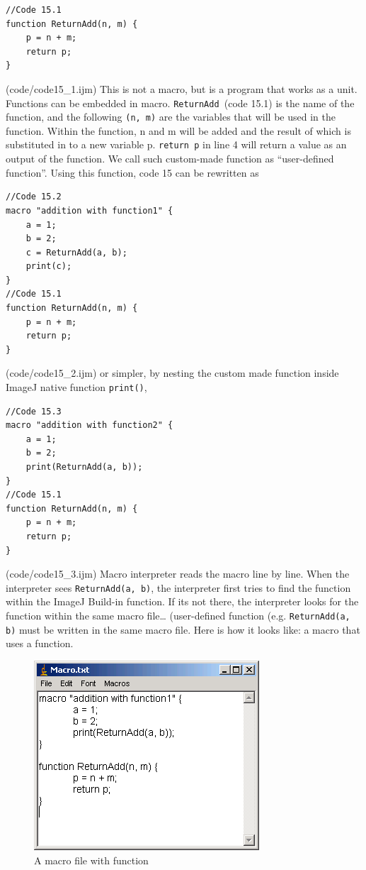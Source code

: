 \documentclass[11pt,a4paper,oneside]{report}
\newcommand{\ilcom}[1]{\texttt{\small#1}}
\begin{document}
\begin{lstlisting}[morekeywords={*,}]
//Code 15.1
function ReturnAdd(n, m) {
	p = n + m;
	return p;
}

\end{lstlisting}
(code/code15_1.ijm)
This is not a macro, but is a program that works as a unit. 
Functions can be embedded in macro. \ilcom{ReturnAdd }(code 15.1) is the name of the function, 
and the following \ilcom{(n, m)} are the variables that will be used in the function. Within the function, 
n and m will be added and the result of which is substituted in to a new variable p. 
\ilcom{return p} in line 4 will return a value as an output of the function. 
We call such custom-made function as ``user-defined function''. Using this function, code 15 can be rewritten as

\begin{lstlisting}[morekeywords={*,}]
//Code 15.2
macro "addition with function1" {
	a = 1;
	b = 2;
	c = ReturnAdd(a, b);
	print(c);
}
//Code 15.1
function ReturnAdd(n, m) {
	p = n + m;
	return p;
}
\end{lstlisting}
(code/code15_2.ijm)
or simpler, by nesting the custom made function inside ImageJ native function \ilcom{print()},

\begin{lstlisting}[morekeywords={*,}]
//Code 15.3
macro "addition with function2" {
	a = 1;
	b = 2;
	print(ReturnAdd(a, b));
}
//Code 15.1
function ReturnAdd(n, m) {
	p = n + m;
	return p;
}
\end{lstlisting}
(code/code15_3.ijm)
Macro interpreter reads the macro line by line. When the interpreter sees \ilcom{ReturnAdd(a, b)}, 
the interpreter first tries to find the function within the ImageJ Build-in function. 
If its not there, the interpreter looks for the function within the same macro file\ldots 
(user-defined function (e.g. \ilcom{ReturnAdd(a, b)} must be written in the same macro file. 
Here is how it looks like: a macro that uses a function. 
\begin{figure}[htbp]
\begin{center}
\includegraphics[scale=0.6]{fig/fig2411_usingFunction.png}
\caption{A macro file with function}
\label{fig:MacroWithFunction}
\end{center}
\end{figure} 
\end{document}

